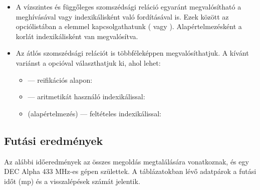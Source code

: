\begin{itemize}
\item A vízszintes és függőleges szomszédsági reláció egyaránt megvalósítható
a  meghívásával vagy indexikálisként való fordításával is.
Ezek között az opciólistában a  elemmel kapcsolgathatunk
( vagy ). Alapértelmezésként a korlát
indexikálisként van megvalósítva.

\item Az átlós szomszédsági relációt is többféleképpen megvalósíthatjuk.
A kívánt variánst a  opcióval választhatjuk ki, ahol 
lehet:

\begin{itemize}
\item {} --- reifikációs alapon: 
\item {} --- aritmetikát használó indexikálissal:\\
\item {} (alapértelmezés) --- feltételes indexikálissal:
\end{itemize}
\end{itemize}

\subsection{Futási eredmények}

Az alábbi időeredmények az összes megoldás megtalálására vonatkoznak, és egy
DEC Alpha 433 MHz-es gépen születtek. A táblázatokban lévő adatpárok a futási
időt (mp) és a visszalépések számát jelentik.

